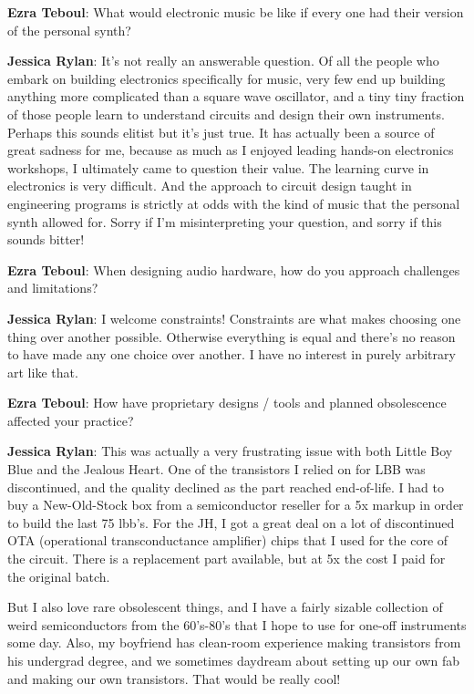 \textbf{Ezra Teboul}: What would electronic music be like if every one had their version of the personal synth? 
        
\textbf{Jessica Rylan}: It's not really an answerable question. Of all the people who embark on building electronics specifically for music, very few end up building anything more complicated than a square wave oscillator, and a tiny tiny fraction of those people learn to understand circuits and design their own instruments. Perhaps this sounds elitist but it's just true. It has actually been a source of great sadness for me, because as much as I enjoyed leading hands-on electronics workshops, I ultimately came to question their value. The learning curve in electronics is very difficult. And the approach to circuit design taught in engineering programs is strictly at odds with the kind of music that the personal synth allowed for. Sorry if I'm misinterpreting your question, and sorry if this sounds bitter!

\textbf{Ezra Teboul}: When designing audio hardware, how do you approach challenges and limitations?

\textbf{Jessica Rylan}: I welcome constraints! Constraints are what makes choosing one thing over another possible. Otherwise everything is equal and there's no reason to have made any one choice over another. I have no interest in purely arbitrary art like that.

\textbf{Ezra Teboul}: How have proprietary designs / tools and planned obsolescence affected your practice?
					
\textbf{Jessica Rylan}: This was actually a very frustrating issue with both Little Boy Blue and the Jealous Heart. One of the transistors I relied on for LBB was discontinued, and the quality declined as the part reached end-of-life. I had to buy a New-Old-Stock box from a semiconductor reseller for a 5x markup in order to build the last 75 lbb's. For the JH, I got a great deal on a lot of discontinued OTA (operational transconductance amplifier) chips that I used for the core of the circuit. There is a replacement part available, but at 5x the cost I paid for the original batch.

But I also love rare obsolescent things, and I have a fairly sizable collection of weird semiconductors from the 60's-80's that I hope to use for one-off instruments some day. Also, my boyfriend has clean-room experience making transistors from his undergrad degree, and we sometimes daydream about setting up our own fab and making our own transistors. That would be really cool!

